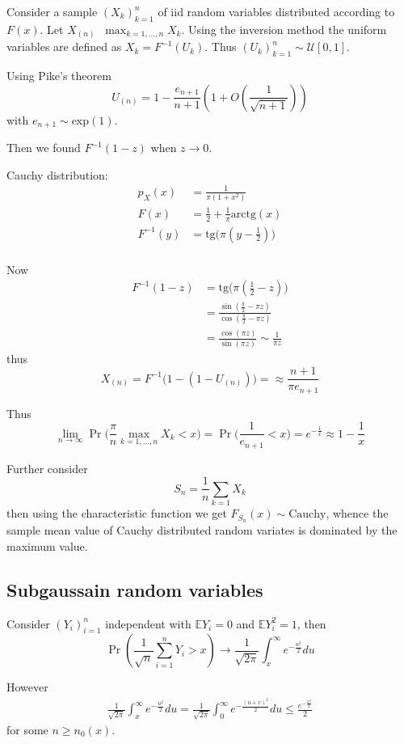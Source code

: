 \documentclass[a4paper]{article}
\newcommand{\clo}[1]{{\left [ #1 \right ]}}
\newcommand{\brac}[1]{{\left ( #1 \right )}}
\newcommand{\Ex}{\mathbb{E}}
\newcommand{\defn}{\mathop{\overset{\Delta}{=}}\nolimits}
\begin{document}
Consider a sample $\brac{X_k}_{k=1}^n$ of iid random variables distributed according to $F(x)$. Let $X_{(n)} \defn \max_{k=1,\ldots,n} X_k$. Using the inversion method the uniform variables are defined as $X_k = F^{-1}(U_k)$. Thus $\brac{U_k}_{k=1}^n\sim \mathcal{U}\clo{0,1}$.

Using Pike's theorem
\[U_{(n)} = 1 - \frac{e_{n+1}}{n+1}\brac{1+O(\frac{1}{\sqrt{n+1}})}\] with $e_{n+1}\sim\text{exp}(1)$.

Then we found $F^{-1}(1-z)$ when $z\to 0$.

Cauchy distribution:
\begin{align*}
	p_X(x) &= \frac{1}{\pi(1+x^2)} \\
	F(x) &= \frac{1}{2} + \frac{1}{\pi} \text{arctg}(x) \\
	F^{-1}(y) &= \text{tg}\big(\pi (y-\frac{1}{2}) \big) \\
\end{align*}

Now \begin{align*}
	F^{-1}(1-z)
	& = \text{tg}\big(\pi (\frac{1}{2}-z) \big)\\
	& = \frac{\sin(\frac{\pi}{2} - \pi z)}{\cos(\frac{\pi}{2} - \pi z)}\\
	& = \frac{\cos(\pi z)}{\sin(\pi z)} \sim \frac{1}{\pi z}
\end{align*}
thus 
\[X_{(n)} = F^{-1}\big( 1 - (1-U_{(n)}) \big) = \approx \frac{n+1}{\pi e_{n+1}}\]

Thus 
\[\lim_{n\to \infty}\Pr\big( \frac{\pi}{n}\max_{k=1,\ldots,n}X_k < x \big) = \Pr\big(\frac{1}{e_{n+1}} < x\big) = e^{-\frac{1}{x}} \approx 1-\frac{1}{x}\]

Further consider
\[S_n = \frac{1}{n}\sum_{k=1}X_k\]
then using the characteristic function we get $F_{S_n}(x) \sim \text{Cauchy}$, whence the sample mean value of Cauchy distributed random variates is dominated by the maximum value.

\subsection{Subgaussain random variables} %
\label{sub:subgaussain_random_variables}


Consider $\brac{Y_i}_{i=1}^n$  independent with $\Ex Y_i = 0$ and $\Ex Y_i^2 = 1$, then
\[\Pr\brac{ \frac{1}{\sqrt{n}}\sum_{i=1}^n Y_i > x } \to \frac{1}{\sqrt{2\pi}} \int_x^\infty e^{-\frac{u^2}{2}}du \]

However
\begin{align*}
	\frac{1}{\sqrt{2\pi}} \int_x^\infty e^{-\frac{u^2}{2}}du = \frac{1}{\sqrt{2\pi}} \int_0^\infty e^{-\frac{(u+x)^2}{2}}du \leq \frac{e^{-\frac{x^2}{2}}}{2}
\end{align*}
for some $n\geq n_0(x)$.
\end{document}
